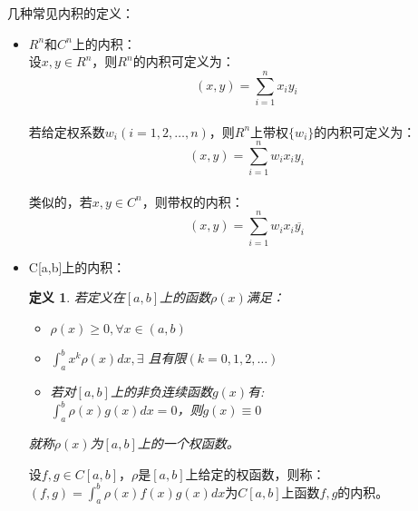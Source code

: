 \documentclass[a4paper]{article}
\newtheorem{definition}{定义}[section]
\begin{document}
几种常见内积的定义：
\begin{itemize}
\item $R^n$和$C^n$上的内积：\\
设$x,y \in R^n$，则$R^n$的内积可定义为：\\
$$(x,y)=\sum^{n}_{i=1}x_iy_i$$\\
若给定权系数$w_i(i=1,2,\dots,n)$，则$R^n$上带权$\{w_i\}$的内积可定义为：\\
$$(x,y)=\sum^{n}_{i=1}w_ix_iy_i$$\\
类似的，若$x,y\in C^n$，则带权的内积：\\
$$(x,y)=\sum^{n}_{i=1}w_ix_i\overline{y_i}$$
\item C[a,b]上的内积：
\begin{definition}
若定义在$[a,b]$上的函数$\rho (x)$满足：
\begin{itemize}
\item $\rho(x) \ge 0, \forall x \in (a,b)$
\item $\int^{b}_{a}x^k\rho(x)dx, \exists$ 且有限$(k=0,1,2,\dots)$
\item 若对$[a,b]$上的非负连续函数$g(x)$有:\\
$\int^{b}_{a}\rho(x)g(x)dx=0$，则$g(x)\equiv 0$
\end{itemize}
就称$\rho(x)$为$[a,b]$上的一个权函数。
\end{definition}
设$f,g\in C[a,b]$，$\rho$是$[a,b]$上给定的权函数，则称：\\
$(f,g)=\int^{b}_{a}\rho(x)f(x)g(x)dx$为$C[a,b]$上函数$f,g$的内积。
\end{itemize}
\end{document}
